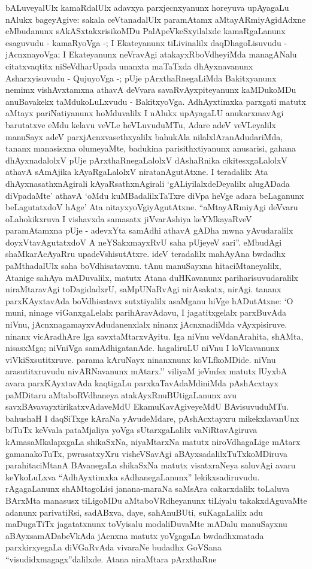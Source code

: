 bALuveyalUlx kamaRdalUlx adavxya parxjecnxyanunx horeyuva upAyagaLu nAlukx bageyAgive:  sakala ceVtanadalUlx paramAtamx aMtayARmiyAgidAdxne eMbudanunx sAkASxtakxrisikoMDu PalApeVkeSxyilalxde kamaRgaLanunx esaguvudu - kamaRyoVga -;  I Ekateyanunx tiLivinalilx daqDhagoLisuvudu - jAcnxnayoVga;  I Ekateyanunx neVravAgi atakayxRboVdheyiMda managANalu citatxvaqtitx niSeVdharUpada unanxta maTaTxda dhAyxnavanunx Asharxyisuvudu - QujuyoVga -;  pUje pArxthaRnegaLiMda Bakitxyanunx nemimx vishAvxtamxna athavA deVvara savaRvAyxpiteyanunx kaMDukoMDu anuBavakekx taMdukoLuLxvudu - BakitxyoVga. AdhAyxtimxka parxgati matutx aMtayx pariNatiyanunx hoMduvalilx I nAlukx upAyagaLU anukarxmavAgi barutatxve eMdu kelavu veVLe heVLuvuduMTu, Adare adeV veVLeyalilx manuSayx adeV parxjAcnxvasethxyalilx bahukAla nilalxlAranAdudariMda, tananx manasisxna olumeyaMte, badukina parisithxtiyanunx anusarisi, gahana dhAyxnadalolxV pUje pArxthaRnegaLalolxV dAshaRnika cikitesxgaLalolxV athavA sAmAjika kAyaRgaLalolxV niratanAgutAtxne. I teradalilx Ata dhAyxnasathxnAgirali kAyaRsathxnAgirali `gALiyilalxdeDeyalilx alugADada diVpadaMte' athavA `oMdu kuMBadalilxTaTxre diVpa heVge adara beLaganunx beLagutatxdoV hAge' Ata nitayxyoVgiyAgutAtxne. ``aMtayARmiyAgi deVvaru oLahokikxruva I vishavxda samasatx jiVvarAshiya keYMkayaRveV paramAtamxna pUje - adevxYta samAdhi athavA gADha mwna yAvudaralilx doyxVtavAgutatxdoV A neYSakxmayxRvU saha pUjeyeV sari''. eMbudAgi shaMkarAcAyaRru upadeVshisutAtxre. ideV teradalilx mahAyAna bwdadhx paMthadalUlx saha boVdhisatavxnu. tAnu manuSayxna hitaciMtaneyalilx, Atanige sahAya mADuvalilx, matutx Atana duHKavanunx pariharisuvudaralilx niraMtaravAgi toDagidadxrU, saMpUNaRvAgi nirAsakatx, nirAgi. tananx parxKAyxtavAda boVdhisatavx sutxtiyalilx asaMganu hiVge hADutAtxne: `O muni, ninage viGanxgaLelalx parihAravAdavu, I jagatitxgelalx parxBuvAda niVnu, jAcnxnagamayxvAdudanenxlalx ninanx jAcnxnadiMda vAyxpisiruve. ninanx vicAradhAre Iga savxtaMtarxvAyitu. Iga niVnu veVdanArahita, shAMta, nisasxMga; niVniVga samAdhigatanAde. hagaliruLU niVnu I loVkavanunx viVkiSxsutitxruve. parama kAruNayx ninanxnunx koVLfkoMDide. niVnu arasutitxruvudu nivARNavanunx mAtarx.'' viliyaM jeVmfsx matutx lUyxbA avara parxKAyxtavAda kaqtigaLu parxkaTavAdaMdiniMda pAshAcxtayx paMDitaru aMtaboRVdhaneya atakAyxRnuBUtigaLanunx avu savxBAvavayxtirikatxvAdaveMdU EkamuKavAgiveyeMdU BAvisuvuduMTu. bahushaH I daqSiTxge kAraNa yAvudeMdare, pAshAcxtayxru mikekxlavanUnx biTuTx keVvala pataMjaliya yoVga sUtarxgaLalilx vaNiRtavAgiruva kAmasaMkalapxgaLa shikaSxNa, niyaMtarxNa matutx niroVdhagaLige mAtarx gamanakoTuTx, pwrasatxyXru visheVSavAgi aBAyxsadalilxTuTxkoMDiruva parahitaciMtanA BAvanegaLa shikaSxNa matutx visatxraNeya saluvAgi avaru keYkoLuLxva ``AdhAyxtimxka sAdhanegaLanunx'' lekikxsadiruvudu. rAgagaLanunx shAMtagoLisi janana-maraNa saMsAra cakarxdalilx toLaluva BArxMta manasusx tiLigoMDu aMtaboVRdheyanunx tiLiyalu takakxdAguvaMte adanunx parivatiRsi, sadABxva, daye, sahAnuBUti, suKagaLalilx adu maDugaTiTx jagatatxnunx toVyisalu modaliDuvaMte mADalu manuSayxnu aBAyxsamADabeVkAda jAcnxna matutx yoVgagaLa bwdadhxmatada parxkirxyegaLa diVGaRvAda vivaraNe budadhx GoVSana ``visudidxmagagx''dalilxde. Atana niraMtara pArxthaRne 